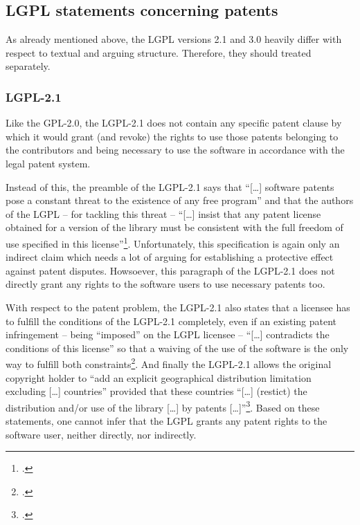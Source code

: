 \subsection{LGPL statements concerning patents}

As already mentioned above, the LGPL versions 2.1 and 3.0 heavily differ  with
respect to textual and arguing structure. Therefore, they should treated
separately.

\subsubsection {LGPL-2.1} \label{subsec:Lgpl21PatentClause}

Like the GPL-2.0, the LGPL-2.1 does not contain any specific patent clause by
which it would grant (and revoke) the rights to use those patents belonging to
the contributors and being necessary to use the software in accordance with the
legal patent system.

Instead of this, the preamble of the LGPL-2.1 says that \enquote{[\ldots]
software patents pose a constant threat to the existence of any free program}
and that the authors of the LGPL -- for tackling this threat --
\enquote{[\ldots] insist that any patent license obtained for a version of the
library must be consistent with the full freedom of use specified in this
license}\footcite[cf.][\nopage wp., Preamble]{Lgpl21OsiLicense1991a}.
Unfortunately, this specification is again only an indirect claim which needs a
lot of arguing for establishing a protective effect against patent disputes.
Howsoever, this paragraph of the LGPL-2.1 does not directly grant any rights to
the software users to use necessary patents too.

With respect to the patent problem, the LGPL-2.1 also states that a licensee has
to fulfill the conditions of the LGPL-2.1 completely, even if an existing patent
infringement -- being \enquote{imposed} on the LGPL licensee --
\enquote{[\ldots] contradicts the conditions of this license} so that a waiving
of the use of the software is the only way to fulfill both
constraints\footcite[cf.][\nopage wp.\ §11]{Lgpl21OsiLicense1991a}. And finally
the LGPL-2.1 allows the original copyright holder to \enquote{add an explicit
geographical distribution limitation excluding [\ldots] countries} provided that
these countries \enquote{[\ldots] (restict) the distribution and/or use of the
library [\ldots] by patents [\ldots]}\footcite[cf.][\nopage wp.\
§12]{Lgpl21OsiLicense1991a}. Based on these statements, one cannot infer that
the LGPL grants any patent rights to the software user, neither directly, nor
indirectly.

